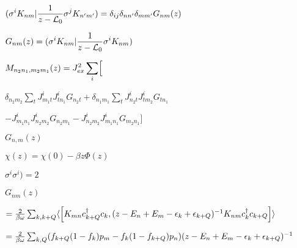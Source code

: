 \documentclass[twoside]{article}
\def\lthtmlcheckvsize{\ifdim\ht\sizebox<\vsize 
  \ifdim\wd\sizebox<\hsize\expandafter\hfill\fi \expandafter\vfill
  \else\expandafter\vss\fi}%
\begin{document}
{\newpage\clearpage
{}%
$\displaystyle ( \sigma^i K_{nm}\vert {1\over z- {\cal L}_0}\sigma^j K_{n'm'})=
\delta_{ij}\delta_{nn'}\delta_{mm'}G_{nm}(z)
$%
\lthtmlindisplaymathZ
\lthtmlcheckvsize\clearpage}

{\newpage\clearpage
{}%
$\displaystyle G_{nm}(z)=( \sigma^i K_{nm}\vert {1\over  {z-\cal L}_0}\sigma^i K_{nm})
$%
\lthtmlindisplaymathZ
\lthtmlcheckvsize\clearpage}

{\newpage\clearpage
{}%
$\displaystyle M_{n_2n_1,m_2m_1}(z)=J_{ex}^2\sum_i\Bigl[$%
\lthtmlindisplaymathZ
\lthtmlcheckvsize\clearpage}

{\newpage\clearpage
{}%
$\textstyle \delta_{n_2m_2}\sum_tJ^i_{m_1t}J^i_{tn_1}G_{n_2t}
+ \delta_{n_1m_1}\sum_tJ^i_{
n_2t}J^i_{tm_2}G_{tn_1}$%
\lthtmlindisplaymathZ
\lthtmlcheckvsize\clearpage}

{\newpage\clearpage
{}%
$\textstyle -J^i_{m_1n_1}J^i_{n_2m_2}G_{n_2m_1}
-J^i_{n_2m_2}J^i_{m_1n_1}G_{m_2n_1}\Bigr]$%
\lthtmlindisplaymathZ
\lthtmlcheckvsize\clearpage}

{\newpage\clearpage
{}%
$G_{n,m}(z)$%
\lthtmlindisplaymathZ
\lthtmlcheckvsize\clearpage}

{\newpage\clearpage
{}%
$\displaystyle \chi(z)= \chi(0)-\beta z \Phi(z)
$%
\lthtmlindisplaymathZ
\lthtmlcheckvsize\clearpage}

{\newpage\clearpage
{}%
$\sigma^i\sigma^i)=2$%
\lthtmlindisplaymathZ
\lthtmlcheckvsize\clearpage}

{\newpage\clearpage
{}%
$\displaystyle G_{nm}(z)$%
\lthtmlindisplaymathZ
\lthtmlcheckvsize\clearpage}

{\newpage\clearpage
{}%
$\textstyle = {2\over \beta \omega}\sum_{k,k+Q} \langle \Bigl[K_{mn}
c^\dagger_{k+Q}c_{k},(z - E_n +
E_m  -\epsilon_k+\epsilon_{k+Q})^{-1} K_{nm}
c^\dagger_{k}c_{k+Q}\Bigr]\rangle$%
\lthtmlindisplaymathZ
\lthtmlcheckvsize\clearpage}

{\newpage\clearpage
{}%
$\textstyle =  {2\over \beta \omega
}\sum_{k,Q}(f_{k+Q}(1-f_{k})p_m-f_{k}(1-f_{k+Q})p_n)(
z-E_n+E_m-\epsilon_{k}+\epsilon_{k+Q})^{-1}$%
\lthtmlindisplaymathZ
\lthtmlcheckvsize\clearpage}
\end{document}
